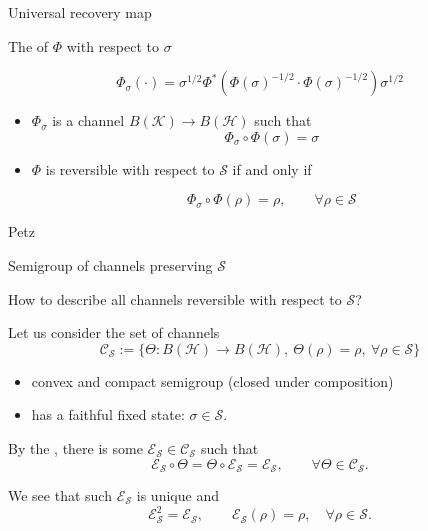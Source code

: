 \documentclass[mathserif]{beamer}
\newcommand{\<}{\langle}
\renewcommand{\>}{\rangle}
\newcommand{\Se}{\mathcal S}
\newcommand{\Ee}{\mathcal E}
\newcommand{\Ce}{\mathcal C}
\newcommand{\Ha}{\mathcal H}
\newcommand{\Ka}{\mathcal K}
\begin{document}
\begin{frame}{Universal recovery map}

The  of $\Phi$ with respect to $\sigma$

\[
\Phi_\sigma(\cdot)=
\sigma^{1/2}\Phi^*(\Phi(\sigma)^{-1/2}\cdot \Phi(\sigma)^{-1/2})\sigma^{1/2}
\]


\begin{itemize}

\item $\Phi_\sigma$ is a channel $B(\Ka)\to B(\Ha)$ such that 
\[
\Phi_\sigma\circ\Phi(\sigma)=\sigma
\]


\item $\Phi$  is reversible with respect to $\Se$ if and only if

\[
\Phi_\sigma\circ \Phi(\rho)=\rho, \qquad \forall\rho\in \Se
\]


\end{itemize}

Petz


\end{frame}


\begin{frame}{Semigroup of channels preserving $\Se$}

How to describe all channels reversible with respect to $\Se$?

\medskip

Let us consider the set of channels 
\[
\Ce_\Se:=\{\Theta: B(\Ha)\to B(\Ha),\ \Theta(\rho)=\rho,\ \forall \rho\in \Se\}
\]

\begin{itemize}
\item convex and compact semigroup (closed under composition)
\item has a faithful fixed state: $\sigma\in \Se$.
\end{itemize}

\medskip

By the , there is some  $\Ee_\Se\in \Ce_\Se$ such that
\[
\Ee_\Se\circ \Theta=\Theta\circ \Ee_\Se=\Ee_\Se,\qquad \forall \Theta\in \Ce_\Se.
\]%

We see that such $\Ee_\Se$ is unique and
\[
 \Ee_\Se^2=\Ee_\Se,\qquad \Ee_\Se(\rho)=\rho,\quad \forall \rho\in \Se.
\]


\end{frame}
\end{document}
